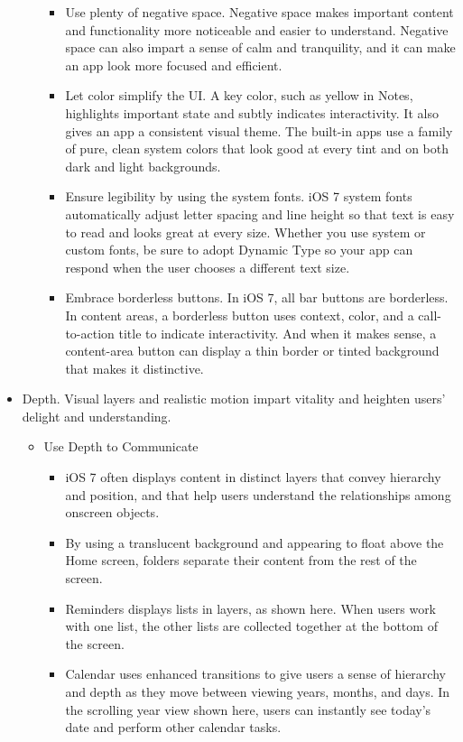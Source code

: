 \begin{itemize}
\begin{itemize}
\begin{itemize}
		\item Use plenty of negative space. Negative space makes important content and functionality more noticeable and easier to understand. Negative space can also impart a sense of calm and tranquility, and it can make an app look more focused and efficient.
		\item Let color simplify the UI. A key color, such as yellow in Notes, highlights important state and subtly indicates interactivity. It also gives an app a consistent visual theme. The built-in apps use a family of pure, clean system colors that look good at every tint and on both dark and light backgrounds.
		\item Ensure legibility by using the system fonts. iOS 7 system fonts automatically adjust letter spacing and line height so that text is easy to read and looks great at every size. Whether you use system or custom fonts, be sure to adopt Dynamic Type so your app can respond when the user chooses a different text size.
		\item Embrace borderless buttons. In iOS 7, all bar buttons are borderless. In content areas, a borderless button uses context, color, and a call-to-action title to indicate interactivity. And when it makes sense, a content-area button can display a thin border or tinted background that makes it distinctive.
		\end{itemize}
	\end{itemize}
\item Depth. Visual layers and realistic motion impart vitality and heighten users' delight and understanding.
	\begin{itemize}
	\item Use Depth to Communicate
		\begin{itemize}
		\item iOS 7 often displays content in distinct layers that convey hierarchy and position, and that help users understand the relationships among onscreen objects.
		\item By using a translucent background and appearing to float above the Home screen, folders separate their content from the rest of the screen.
		\item Reminders displays lists in layers, as shown here. When users work with one list, the other lists are collected together at the bottom of the screen.
		\item Calendar uses enhanced transitions to give users a sense of hierarchy and depth as they move between viewing years, months, and days. In the scrolling year view shown here, users can instantly see today's date and perform other calendar tasks.

\end{itemize}
\end{itemize}
\end{itemize}
